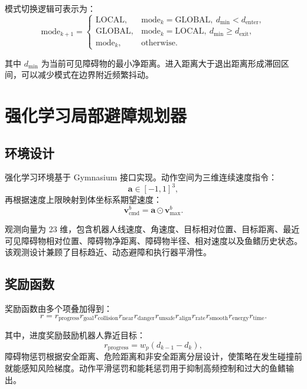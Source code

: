 \documentclass[UTF8,a4paper,12pt]{ctexart}
\begin{document}
模式切换逻辑可表示为：
\begin{equation}
\mathrm{mode}_{k+1} =
\begin{cases}
\mathrm{LOCAL}, & \mathrm{mode}_k=\mathrm{GLOBAL},\ d_{\min}<d_{\mathrm{enter}},\\
\mathrm{GLOBAL}, & \mathrm{mode}_k=\mathrm{LOCAL},\ d_{\min}\ge d_{\mathrm{exit}},\\
\mathrm{mode}_k, & \mathrm{otherwise}.
\end{cases}
\end{equation}

其中 $d_{\min}$ 为当前可见障碍物的最小净距离。进入距离大于退出距离形成滞回区间，可以减少模式在边界附近频繁抖动。

\section{强化学习局部避障规划器}

\subsection{环境设计}

强化学习环境基于 Gymnasium 接口实现。动作空间为三维连续速度指令：
\begin{equation}
\bm{a} \in [-1,1]^3,
\end{equation}
再根据速度上限映射到体坐标系期望速度：
\begin{equation}
\bm{v}_{\mathrm{cmd}}^{b} =
\bm{a} \odot \bm{v}_{\max}^{b}.
\end{equation}

观测向量为 23 维，包含机器人线速度、角速度、目标相对位置、目标距离、最近可见障碍物相对位置、障碍物净距离、障碍物半径、相对速度以及鱼鳍历史状态。该观测设计兼顾了目标趋近、动态避障和执行器平滑性。

\subsection{奖励函数}

奖励函数由多个项叠加得到：
\begin{equation}
r =
r_{\mathrm{progress}}
r_{\mathrm{goal}}
r_{\mathrm{collision}}
r_{\mathrm{near}}
r_{\mathrm{danger}}
r_{\mathrm{unsafe}}
r_{\mathrm{align}}
r_{\mathrm{rate}}
r_{\mathrm{smooth}}
r_{\mathrm{energy}}
r_{\mathrm{time}}.
\end{equation}

其中，进度奖励鼓励机器人靠近目标：
\begin{equation}
r_{\mathrm{progress}} = w_p(d_{k-1}-d_k),
\end{equation}
障碍物惩罚根据安全距离、危险距离和非安全距离分层设计，使策略在发生碰撞前就能感知风险梯度。动作平滑惩罚和能耗惩罚用于抑制高频控制和过大的鱼鳍输出。
\end{document}
